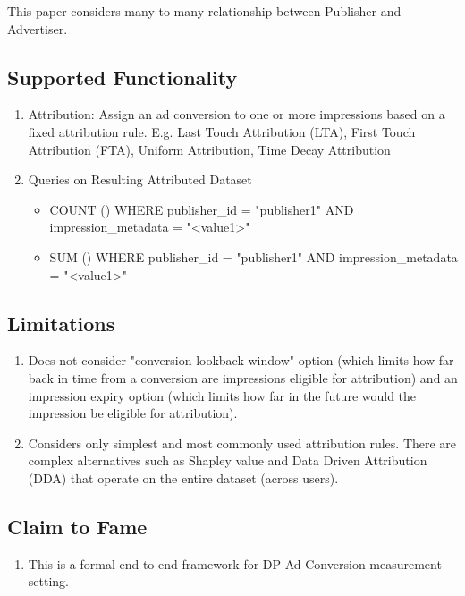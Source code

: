 This paper considers many-to-many relationship between Publisher and Advertiser.

\subsection{Supported Functionality}
\begin{enumerate}
    \item Attribution: Assign an ad conversion to one or more impressions based on a fixed attribution rule. E.g. Last Touch Attribution (LTA), First Touch Attribution (FTA), Uniform Attribution, Time Decay Attribution
    \item Queries on Resulting Attributed Dataset 
        \begin{itemize}
            \item COUNT () WHERE publisher\_id = "publisher1" AND  impression\_metadata = "<value1>"
            \item SUM () WHERE publisher\_id = "publisher1" AND impression\_metadata = "<value1>"
        \end{itemize}        
\end{enumerate}


\subsection{Limitations}
\begin{enumerate}
    \item Does not consider "conversion lookback window" option (which limits how far back in time from a conversion are impressions eligible for attribution) and an impression expiry option (which limits how far in the future would the impression be eligible for attribution).
    \item Considers only simplest and most commonly used attribution rules. There are complex alternatives such as Shapley value and Data Driven Attribution (DDA) that operate on the entire dataset (across users).
\end{enumerate}

\subsection{Claim to Fame}
\begin{enumerate}
    \item This is a formal end-to-end framework for DP Ad Conversion measurement setting. 
\end{enumerate}




%

